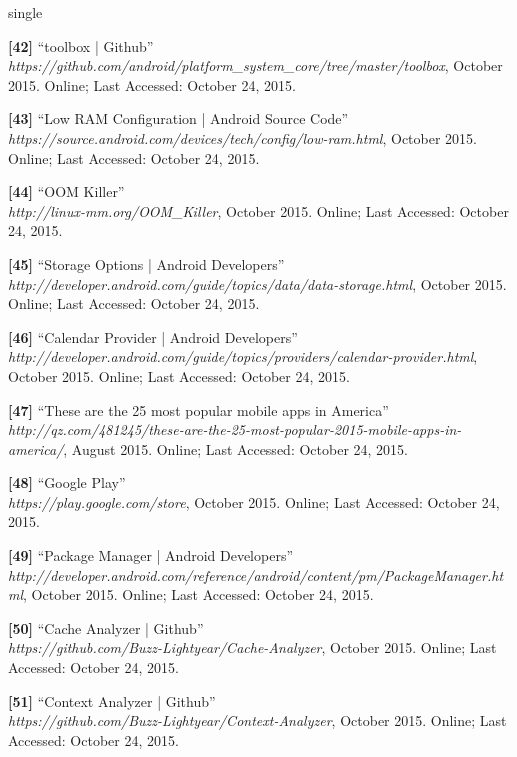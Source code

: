 \documentclass[12pt]{uthesis-v12}  %
\begin{document}
\begin{referencelist}{single}
	\item \textbf{[42]} ``toolbox | Github''
	\\\emph{https://github.com/android/platform\_system\_core/tree/master/toolbox}, October 2015. 
	Online; Last Accessed: October 24, 2015.	
					
	\item \textbf{[43]} ``Low RAM Configuration | Android Source Code''
	\\\emph{https://source.android.com/devices/tech/config/low-ram.html}, October 2015. 
	Online; Last Accessed: October 24, 2015.
						
	\item \textbf{[44]} ``OOM Killer''
	\\\emph{http://linux-mm.org/OOM\_Killer}, October 2015. 
	Online; Last Accessed: October 24, 2015.
	
	\item \textbf{[45]} ``Storage Options | Android Developers''
	\\\emph{http://developer.android.com/guide/topics/data/data-storage.html}, October 2015. 
	Online; Last Accessed: October 24, 2015.

	\item \textbf{[46]} ``Calendar Provider | Android Developers''
	\\\emph{http://developer.android.com/guide/topics/providers/calendar-provider.html}, October 2015. 
	Online; Last Accessed: October 24, 2015.

	\item \textbf{[47]} ``These are the 25 most popular mobile apps in America''
	\\\emph{http://qz.com/481245/these-are-the-25-most-popular-2015-mobile-apps-in-america/}, August 2015. 
	Online; Last Accessed: October 24, 2015.
	
	\item \textbf{[48]} ``Google Play''
	\\\emph{https://play.google.com/store}, October 2015. 
	Online; Last Accessed: October 24, 2015.
											
	\item \textbf{[49]} ``Package Manager | Android Developers''
	\\\emph{http://developer.android.com/reference/android/content/pm/PackageManager.html}, October 2015. 
	Online; Last Accessed: October 24, 2015.

	\item \textbf{[50]} ``Cache Analyzer | Github''
	\\\emph{https://github.com/Buzz-Lightyear/Cache-Analyzer}, October 2015. 
	Online; Last Accessed: October 24, 2015.
	
	\item \textbf{[51]} ``Context Analyzer | Github''
	\\\emph{https://github.com/Buzz-Lightyear/Context-Analyzer}, October 2015. 
	Online; Last Accessed: October 24, 2015.													
\end{referencelist}
\end{document}
